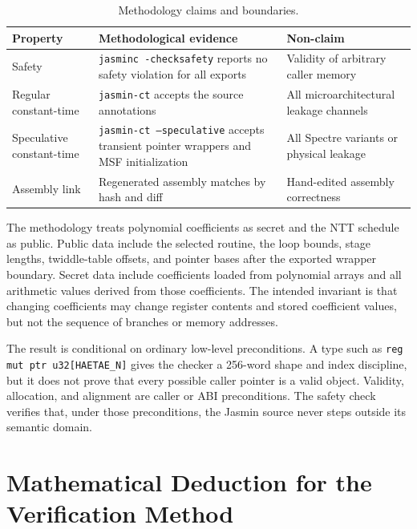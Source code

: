 \documentclass[10pt,twocolumn]{article}
\newcommand{\jasmin}{Jasmin}
\newcommand{\ct}{constant-time}
\begin{document}
\begin{table}[t]
\centering
\scriptsize
\setlength{\tabcolsep}{3pt}
\begin{tabular}{P{0.25\columnwidth}P{0.39\columnwidth}P{0.26\columnwidth}}
\toprule
Property & Methodological evidence & Non-claim \\
\midrule
Safety & \texttt{jasminc -checksafety} reports no safety violation for all
exports & Validity of arbitrary caller memory \\
Regular \ct{} & \texttt{jasmin-ct} accepts the source annotations & All
microarchitectural leakage channels \\
Speculative \ct{} & \texttt{jasmin-ct --speculative} accepts transient pointer
wrappers and MSF initialization & All Spectre variants or physical leakage \\
Assembly link & Regenerated assembly matches  by hash and diff &
Hand-edited assembly correctness \\
\bottomrule
\end{tabular}
\caption{Methodology claims and boundaries.}
\label{tab:claims}
\end{table}

The methodology treats polynomial coefficients as secret and the NTT schedule as
public.  Public data include the selected routine, the loop bounds, stage
lengths, twiddle-table offsets, and pointer bases after the exported wrapper
boundary.  Secret data include coefficients loaded from polynomial arrays and
all arithmetic values derived from those coefficients.  The intended invariant
is that changing coefficients may change register contents and stored
coefficient values, but not the sequence of branches or memory addresses.

The result is conditional on ordinary low-level preconditions.  A type such as
\texttt{reg mut ptr u32[HAETAE\_N]} gives the checker a 256-word shape and
index discipline, but it does not prove that every possible caller pointer is a
valid object.  Validity, allocation, and alignment are caller or ABI
preconditions.  The safety check verifies that, under those preconditions, the
\jasmin{} source never steps outside its semantic domain.


\section{Mathematical Deduction for the Verification Method}
\end{document}
